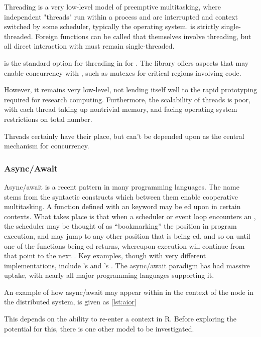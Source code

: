 Threading is a very low-level model of preemptive multitasking, where independent "threads" run within a process and are interrupted and context switched by some scheduler, typically the operating system.
\R{} is strictly single-threaded.
Foreign  functions can be called that themselves involve threading, but all direct interaction with \R{} must remain single-threaded.

\cite{nichols1996pthreads} is the standard option for threading in  for \R{}.
The library offers aspects that may enable concurrency with \R{}, such as mutexes for critical regions involving \R{} code.

However, it remains very low-level, not lending itself well to the rapid prototyping required for research computing.
Furthermore, the scalability of threads is poor, with each thread taking up nontrivial memory, and facing operating system restrictions on total number.

Threads certainly have their place, but can't be depended upon as the central mechanism for concurrency.

\subsubsection{Async/Await}

Async/await is a recent pattern in many programming languages.
The name stems from the syntactic constructs which between them enable cooperative multitasking.
A function defined with an  keyword may be ed upon in certain contexts.
What takes place is that when a scheduler or event loop encounters an , the scheduler may be thought of as ``bookmarking'' the position in program execution, and may jump to any other position that is being ed, and so on until one of the functions being ed returns, whereupon execution will continue from that point to the next .
Key examples, though with very different implementations, include 's  and 's .
The async/await paradigm has had massive uptake, with nearly all major programming languages supporting it.

An example of how async/await may appear within \R{} in the context of the node in the distributed system, is given as \cref{lst:aior}


This depends on the ability to re-enter a context in R.
Before exploring the potential for this, there is one other model to be investigated.

